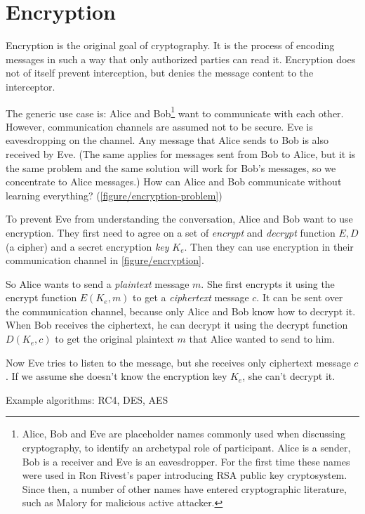 \section{Encryption}
\label{toc/encryption}




Encryption is the original goal of cryptography. It is the process of encoding messages in such a way that only authorized parties can read it. Encryption does not of itself prevent interception, but denies the message content to the interceptor.

The generic use case is: Alice and Bob\footnote{Alice, Bob and Eve are placeholder names commonly used when discussing cryptography, to identify an archetypal role of participant. Alice is a sender, Bob is a receiver and Eve is an eavesdropper. For the first time these names were used in Ron Rivest's paper introducing RSA public key cryptosystem. \cite{rsa} Since then, a number of other names have entered cryptographic literature, such as Malory for malicious active attacker.} want to communicate with each other. However, communication channels are assumed not to be secure. Eve is eavesdropping on the channel. Any message that Alice sends to Bob is also received by Eve. (The same applies for messages sent from Bob to Alice, but it is the same problem and the same solution will work for Bob's messages, so we concentrate to Alice messages.) How can Alice and Bob communicate without learning everything? (\autoref{figure/encryption-problem}) \cite[p.~23]{ferguson2010cryptography}

To prevent Eve from understanding the conversation, Alice and Bob want to use encryption. They first need to agree on a set of \textit{encrypt} and \textit{decrypt} function $E, D$ (a cipher) and a secret encryption \textit{key} $K_e$. Then they can use encryption in their communication channel in \autoref{figure/encryption}.

So Alice wants to send a \textit{plaintext} message $m$. She first encrypts it using the encrypt function $E(K_e, m)$ to get a \textit{ciphertext} message $c$. It can be sent over the communication channel, because only Alice and Bob know how to decrypt it. When Bob receives the ciphertext, he can decrypt it using the decrypt function $D(K_e, c)$ to get the original plaintext $m$ that Alice wanted to send to him.

Now Eve tries to listen to the message, but she receives only ciphertext message $c$. If we assume she doesn't know the encryption key $K_e$, she can't decrypt it.

Example algorithms: RC4, DES, AES

